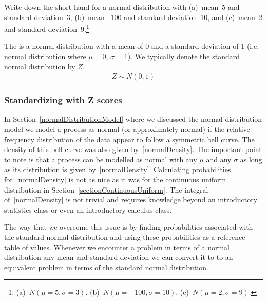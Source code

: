 \begin{exercise}
Write down the short-hand for a normal distribution with (a)~mean~5 and standard deviation~3, (b)~mean~-100 and standard deviation~10, and (c)~mean~2 and standard deviation~9.\footnote{(a)~$N(\mu=5,\sigma=3)$. (b)~$N(\mu=-100, \sigma=10)$. (c)~$N(\mu=2, \sigma=9)$.}
\end{exercise}




\begin{termBox}{
The  is a normal distribution with a mean of 0 and a
standard deviation of 1 (i.e. normal distribution where $\mu=0$, $\sigma=1$).
We typically denote the standard normal distribution by $Z$.
\begin{align}
Z \sim N(0,1)
\end{align}
}
\end{termBox}





\subsubsection{Standardizing with Z scores}

In Section~\ref{normalDistributionModel} where we discussed the normal distribution model we 
model a process as normal (or approximately normal) if the relative frequency distribution of the data appear to follow a symmetric bell curve.
The density of this bell curve was also given by~\ref{normalDensity}.
The important point to note is that a process can be modelled as normal with any
 $\mu$ and any $\sigma$ as long as its distribution is given by~\ref{normalDensity}.
Calculating probabilities for~\ref{normalDensity} is not as nice as it was for the
continuous uniform distribution in Section~\ref{sectionContinuousUniform}.
The integral of~\ref{normalDensity} is not trivial and requires knowledge beyond an introductory
statistics class or even an introductory calculus class.

The way that we overcome this issue is by finding probabilities associated with the
standard normal distribution and using these probabilities as a reference table of values.
Whenever we encounter a problem in terms of a normal distribution any mean and standard deviation
we can convert it to to an equivalent problem in terms of the standard normal distribution.


